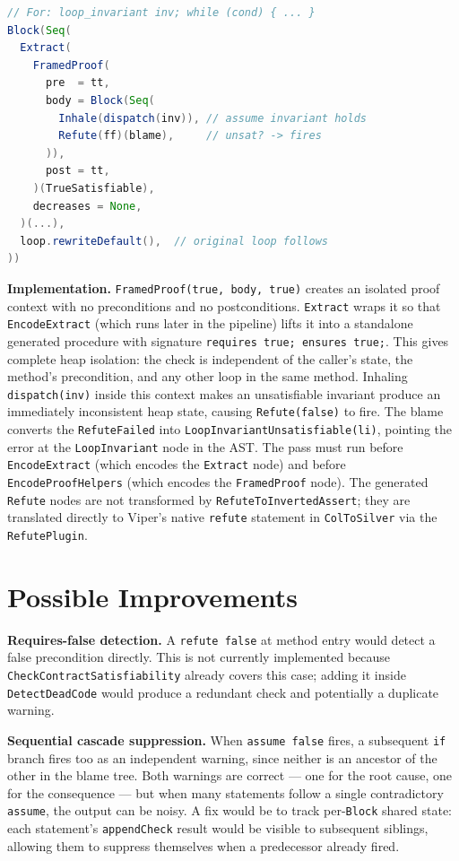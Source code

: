 \documentclass[9pt,a4paper,twocolumn]{article}
\begin{document}
\begin{lstlisting}[language=Scala]
// For: loop_invariant inv; while (cond) { ... }
Block(Seq(
  Extract(
    FramedProof(
      pre  = tt,
      body = Block(Seq(
        Inhale(dispatch(inv)), // assume invariant holds
        Refute(ff)(blame),     // unsat? -> fires
      )),
      post = tt,
    )(TrueSatisfiable),
    decreases = None,
  )(...),
  loop.rewriteDefault(),  // original loop follows
))
\end{lstlisting}

\textbf{Implementation.} \texttt{FramedProof(true, body, true)}
creates an isolated proof context with no preconditions and no
postconditions. \texttt{Extract} wraps it so that
\texttt{EncodeExtract} (which runs later in the pipeline) lifts it
into a standalone generated procedure with signature
\texttt{requires true; ensures true;}. This gives complete heap
isolation: the check is independent of the caller's state, the
method's precondition, and any other loop in the same method.
Inhaling \texttt{dispatch(inv)} inside this context makes an
unsatisfiable invariant produce an immediately inconsistent heap
state, causing \texttt{Refute(false)} to fire. The blame converts
the \texttt{RefuteFailed} into
\texttt{LoopInvariantUnsatisfiable(li)}, pointing the error at the
\texttt{LoopInvariant} node in the AST. The pass must run before
\texttt{EncodeExtract} (which encodes the \texttt{Extract} node)
and before \texttt{EncodeProofHelpers} (which encodes the
\texttt{FramedProof} node). The generated \texttt{Refute} nodes
are not transformed by \texttt{RefuteToInvertedAssert}; they are
translated directly to Viper's native \texttt{refute} statement in
\texttt{ColToSilver} via the \texttt{RefutePlugin}.

\section{Possible Improvements}

\textbf{Requires-false detection.} A \texttt{refute false} at
method entry would detect a false precondition directly. This is
not currently implemented because \texttt{CheckContractSatisfiability}
already covers this case; adding it inside \texttt{DetectDeadCode}
would produce a redundant check and potentially a duplicate warning.

\textbf{Sequential cascade suppression.} When \texttt{assume false}
fires, a subsequent \texttt{if} branch fires too as an independent
warning, since neither is an ancestor of the other in the blame
tree. Both warnings are correct — one for the root cause, one for
the consequence — but when many statements follow a single
contradictory \texttt{assume}, the output can be noisy. A fix
would be to track per-\texttt{Block} shared state: each statement's
\texttt{appendCheck} result would be visible to subsequent siblings,
allowing them to suppress themselves when a predecessor already
fired.
\end{document}
